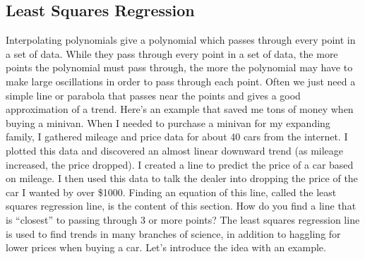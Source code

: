 \subsection{Least Squares Regression}
Interpolating polynomials give a polynomial which passes through every point in a set of data. 
While they pass through every point in a set of data, the more points the polynomial must pass through, the more the polynomial may have to make large oscillations in order to pass through each point.  
Often we just need a simple line or parabola that passes near the points and gives a good approximation of a trend. 
Here's an example that saved me tons of money when buying a minivan. 
When I needed to purchase a minivan for my expanding family, I gathered mileage and price data for about 40 cars from the internet. 
I plotted this data and discovered an almost linear downward trend (as mileage increased, the price dropped).  
I created a line to predict the price of a car based on mileage.  
I then used this data to talk the dealer into dropping the price of the car I wanted by over \$1000. 
Finding an equation of this line, called the least squares regression line, is the content of this section. 
How do you find a line that is ``closest'' to passing through 3 or more points?  
The least squares regression line is used to find trends in many branches of science, in addition to haggling for lower prices when buying a car. Let's introduce the idea with an example. 

